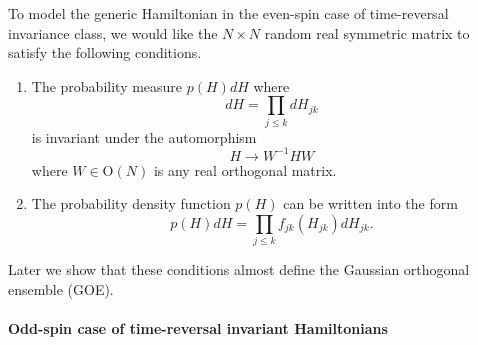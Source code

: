 \documentclass[11pt, a4paper]{article}
\numberwithin{equation}{section}
\newcommand{\Orthogonal}{\mathrm{O}}
\theoremstyle{definition}
\theoremstyle{remark}
\begin{document}
To model the generic Hamiltonian in the even-spin case of time-reversal invariance class, we would like the $N \times N$ random real symmetric matrix to satisfy the following conditions.
\begin{enumerate}
\item \label{enu:first_condition_of_GOE}
  The probability measure $p(H) dH$ where
  \begin{equation} \label{eq:measure_for_real_symm_matrix}
    dH = \prod_{j \leq k} dH_{jk}
  \end{equation}
  is invariant under the automorphism
  \begin{equation} \label{eq:orthogonal_similarity_for_GOE}
    H \to W^{-1} H W
  \end{equation}
  where $W \in \Orthogonal(N)$ is any real orthogonal matrix.
\item
  The probability density function $p(H)$ can be written into the form
  \begin{equation}
    p(H) dH = \prod_{j \leq k} f_{jk}(H_{jk}) dH_{jk}.
  \end{equation}
\end{enumerate}
Later we show that these conditions almost define the Gaussian orthogonal ensemble (GOE).

\paragraph{Odd-spin case of time-reversal invariant Hamiltonians}
\end{document}
